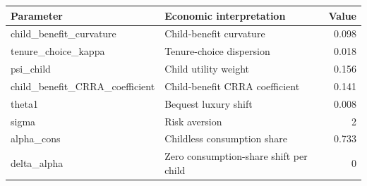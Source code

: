 \begingroup\small
\setlength{\tabcolsep}{3pt}
\renewcommand{\arraystretch}{1.04}
\begin{tabularx}{\linewidth}{XXr}
\toprule
Parameter & Economic interpretation & Value \\
\midrule
child\allowbreak\_benefit\allowbreak\_curvature & Child-benefit curvature & 0.098 \\
tenure\allowbreak\_choice\allowbreak\_kappa & Tenure-choice dispersion & 0.018 \\
psi\allowbreak\_child & Child utility weight & 0.156 \\
child\allowbreak\_benefit\allowbreak\_CRRA\allowbreak\_coefficient & Child-benefit CRRA coefficient & 0.141 \\
theta1 & Bequest luxury shift & 0.008 \\
sigma & Risk aversion & 2 \\
alpha\allowbreak\_cons & Childless consumption share & 0.733 \\
delta\allowbreak\_alpha & Zero consumption-share shift per child & 0 \\
\bottomrule
\end{tabularx}
\endgroup

